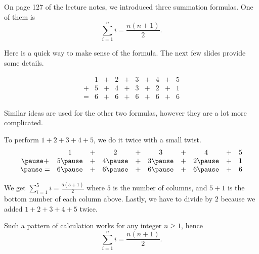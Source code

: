 \documentclass[12pt]{beamer}
\begin{document}
\begin{frame}[t]
  On page 127 of the lecture notes, we introduced three summation formulas. One of them is
  \[
    \sum_{i=1}^{n} i = \frac{n(n+1)}{2}.
  \]

  Here is a quick way to make sense of the formula.
  The next few slides provide some details.
  \medskip

  \[
    \begin{array}{cccccccccc}
      & 1 &+& 2 &+& 3 &+& 4 &+& 5 \\
      + & 5 &+& 4 &+& 3 &+& 2 &+& 1 \\
      = & 6 &+& 6 &+& 6 &+& 6 &+& 6
    \end{array}
  \]

  Similar ideas are used for the other two formulas, however they are a lot more complicated.
\end{frame}

\begin{frame}[t]
  To perform \(1 + 2 + 3 + 4 + 5\), we do it twice with a small twist.
  \[
    \begin{array}{cccccccccc}
      & 1 &+& 2 &+& 3 &+& 4 &+& 5 \\
      \pause + & 5 \pause &+& 4 \pause &+& 3 \pause &+& 2 \pause &+& 1 \\
      \pause = & 6 \pause &+& 6 \pause &+& 6 \pause &+& 6 \pause &+& 6
    \end{array}
  \]

  \pause
  We get \(\sum_{i=1}^{5} i = \frac{5(5+1)}{2}\) where \(5\) is the number of columns, and \(5+1\) is the bottom number of each column above.  Lastly, we have to divide by \(2\) because we added \(1 + 2 + 3 + 4 + 5\) twice.

  \pause
  Such a pattern of calculation works for any integer \(n \ge 1\), hence
  \[
    \sum_{i=1}^{n} i = \frac{n(n+1)}{2}.
  \]
\end{frame}
\end{document}
